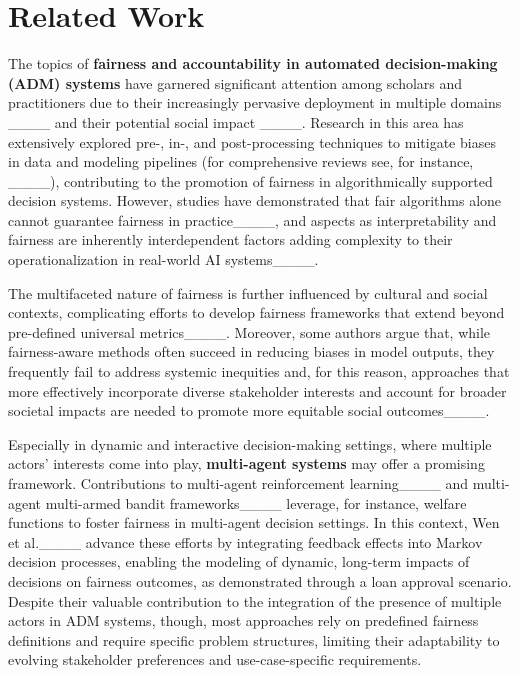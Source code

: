 \section{Related Work}
\label{sec:related}
The topics of \textbf{fairness and accountability in automated decision-making (ADM) systems} have garnered significant attention among scholars and practitioners due to their increasingly pervasive deployment in multiple domains ____ and their potential social impact ____. Research in this area has extensively explored pre-, in-, and post-processing techniques to mitigate biases in data and modeling pipelines (for comprehensive reviews see, for instance, ____), contributing to the promotion of fairness in algorithmically supported decision systems. However, studies have demonstrated that fair algorithms alone cannot guarantee fairness in practice____, and aspects as interpretability and fairness are inherently interdependent factors adding complexity to their operationalization in real-world AI systems____.

The multifaceted nature of fairness is further influenced by cultural and social contexts, complicating efforts to develop fairness frameworks that extend beyond pre-defined universal metrics____. Moreover, some authors argue that, while fairness-aware methods often succeed in reducing biases in model outputs, they frequently fail to address systemic inequities and, for this reason, approaches that more effectively incorporate diverse stakeholder interests and account for broader societal impacts are needed to promote more equitable social outcomes____.

Especially in dynamic and interactive decision-making settings, where multiple actors’ interests come into play, \textbf{multi-agent systems} may offer a promising framework. Contributions to multi-agent reinforcement learning____ and multi-agent multi-armed bandit frameworks____ leverage, for instance, welfare functions to foster fairness in multi-agent decision settings. In this context, Wen et al.____ advance these efforts by integrating feedback effects into Markov decision processes, enabling the modeling of dynamic, long-term impacts of decisions on fairness outcomes, as demonstrated through a loan approval scenario. Despite their valuable contribution to the integration of the presence of multiple actors in ADM systems, though, most approaches rely on predefined fairness definitions and require specific problem structures, limiting their adaptability to evolving stakeholder preferences and use-case-specific requirements.


